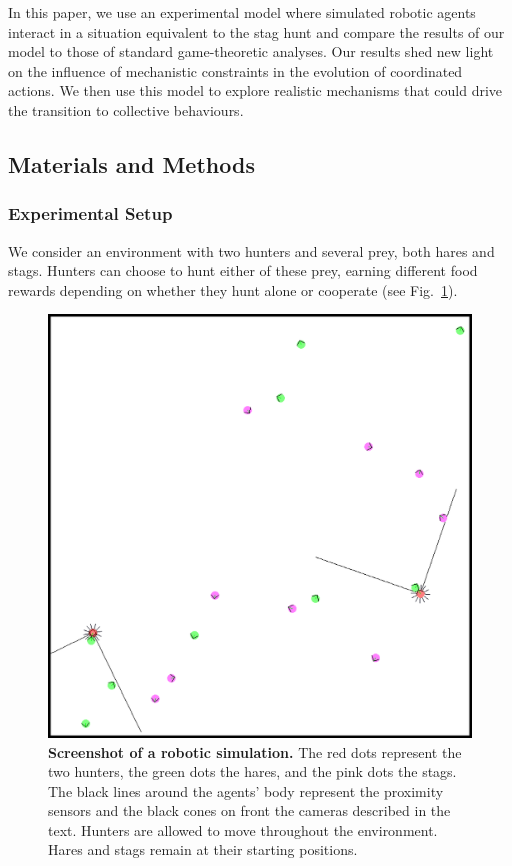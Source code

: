     In this paper, we use an experimental model where simulated robotic agents interact in a situation equivalent to the stag hunt and compare the results of our model to those of standard game-theoretic analyses. Our results shed new light on the influence of mechanistic constraints in the evolution of coordinated actions. We then use this model to explore realistic mechanisms that could drive the transition to collective behaviours.

  \subsection{Materials and Methods}
  \label{sec:methods}
    \subsubsection{Experimental Setup}
    \label{setup}
      We consider an environment with two hunters and several prey, both hares and stags. Hunters can choose to hunt either of these prey, earning different food rewards depending on whether they hunt alone or cooperate (see Fig.~\ref{fig:figureSimulation}).

      \begin{figure}[hbtp]
        \centering
          \includegraphics[scale = 0.25]{fig/ArticleBio1/Fig1.eps}
        \caption{\textbf{Screenshot of a robotic simulation.} 
        The red dots represent the two hunters, the green dots the hares, and the pink dots the stags. The black lines around the agents' body represent the proximity sensors and the black cones on front the cameras described in the text. Hunters are allowed to move throughout the environment. Hares and stags remain at their starting positions.}
        \label{fig:figureSimulation}
      \end{figure}

